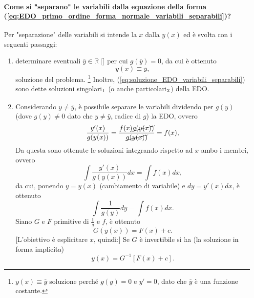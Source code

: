 \paragraph{Come si "separano" le variabili dalla equazione della forma (\ref{eq:EDO_primo_ordine_forma_normale_variabili_separabili})?} Per "separazione" delle variabili si intende la $x$ dalla $y(x)$ ed è svolta con i seguenti passaggi:
\begin{enumerate}
    \item determinare eventuali $\bar y\in\mathbb R$ [\footnotemark] per cui $g(\bar y)=0$, da cui è ottenuto
    \begin{equation}\label{eq:soluzione_EDO_variabili_separabili}
        y(x)\equiv \bar y,
    \end{equation}
    soluzione del problema. \footnote{$y(x)\equiv\bar y$ soluzione perché $g(y)=0$ e $y'=0$, dato che $\bar y$ è una funzione costante.} Inoltre, (\ref{eq:soluzione_EDO_variabili_separabili}) sono dette soluzioni singolari$_{\footnotemark}$ (o anche particolari$_{\footnotemark}$) della EDO.
    \item Considerando $y\neq\bar y$, è possibile separare le variabili dividendo per $g(y)$ (dove $g(y)\neq 0$ dato che $y\neq \bar y$, radice di $g$) la EDO, ovvero
    \begin{equation*}
        \frac{y'(x)}{g(y(x))} = \frac{f(x) \cancel{g(y(x))}}{\cancel{g(y(x))}} = f(x),
    \end{equation*}
    Da questa sono ottenute le soluzioni integrando rispetto ad $x$ ambo i membri, ovvero
    \begin{equation*}
        \int\frac{y'(x)}{g(y(x))}dx=\int f(x)dx,
    \end{equation*}
    da cui, ponendo $y=y(x)$ (cambiamento di variabile) e $dy = y'(x)dx$, è ottenuto
    \begin{equation*}
        \int \frac{1}{g(y)}dy = \int f(x)dx.
    \end{equation*}
    Siano $G$ e $F$ primitive di $\frac{1}{g}$ e $f$, è ottenuto
    \begin{equation*}
        G(y(x)) = F(x) + c.
    \end{equation*}
    [L'obiettivo è esplicitare $x$, quindi:] Se $G$ è invertibile si ha (la soluzione in forma implicita)
    \begin{equation*}
        y(x) = G^{-1} [F(x) + c].
    \end{equation*}
\end{enumerate}

\addtocounter{footnote}{-2}

